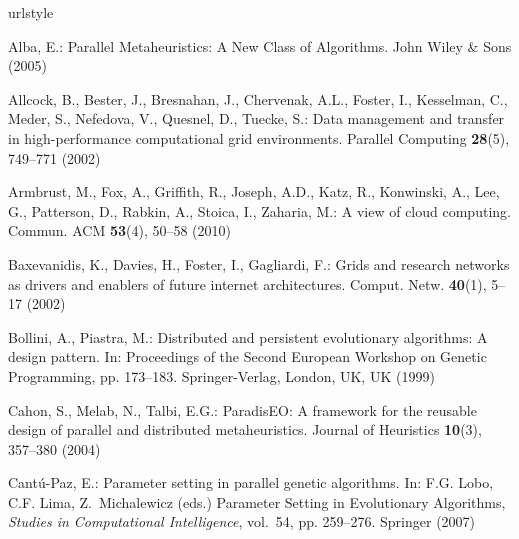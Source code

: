 %

% 



%


\begin{thebibliography}{10}
\providecommand{\url}[1]{{#1}}
\providecommand{\urlprefix}{URL }
\expandafter\ifx\csname urlstyle\endcsname\relax
  \providecommand{\doi}[1]{DOI~\discretionary{}{}{}#1}\else
  \providecommand{\doi}{DOI~\discretionary{}{}{}\begingroup
  \urlstyle{rm}\Url}\fi

Alba, E.: Parallel Metaheuristics: {A} New Class of Algorithms.
\newblock John Wiley \& Sons (2005)

Allcock, B., Bester, J., Bresnahan, J., Chervenak, A.L., Foster, I., Kesselman,
  C., Meder, S., Nefedova, V., Quesnel, D., Tuecke, S.: Data management and
  transfer in high-performance computational grid environments.
\newblock Parallel Computing \textbf{28}(5), 749--771 (2002)

Armbrust, M., Fox, A., Griffith, R., Joseph, A.D., Katz, R., Konwinski, A.,
  Lee, G., Patterson, D., Rabkin, A., Stoica, I., Zaharia, M.: A view of cloud
  computing.
\newblock Commun. ACM \textbf{53}(4), 50--58 (2010)

Baxevanidis, K., Davies, H., Foster, I., Gagliardi, F.: Grids and research
  networks as drivers and enablers of future internet architectures.
\newblock Comput. Netw. \textbf{40}(1), 5--17 (2002)

Bollini, A., Piastra, M.: Distributed and persistent evolutionary algorithms: A
  design pattern.
\newblock In: Proceedings of the Second European Workshop on Genetic
  Programming, pp. 173--183. Springer-Verlag, London, UK, UK (1999)

Cahon, S., Melab, N., Talbi, E.G.: {ParadisEO}: A framework for the reusable
  design of parallel and distributed metaheuristics.
\newblock Journal of Heuristics \textbf{10}(3), 357--380 (2004)

Cant\'u-Paz, E.: Parameter setting in parallel genetic algorithms.
\newblock In: F.G. Lobo, C.F. Lima, Z.~Michalewicz (eds.) Parameter Setting in
  Evolutionary Algorithms, \emph{Studies in Computational Intelligence},
  vol.~54, pp. 259--276. Springer (2007)


\end{thebibliography}
